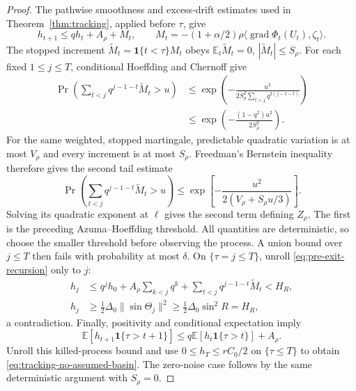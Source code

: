 \begin{proof}
The pathwise smoothness and excess-drift estimates used in
Theorem~\ref{thm:tracking}, applied before $\tau$, give
\begin{equation}
 h_{t+1}\le qh_t+A_\rho+M_t,\qquad
 M_t=-(1+\alpha/2)\rho
       \langle\operatorname{grad}\Phi_t(U_t),\zeta_t\rangle.
 \label{eq:pre-exit-recursion}
\end{equation}
The stopped increment $\widetilde M_t=\mathbf1\{t<\tau\}M_t$ obeys
$\mathbb E_t\widetilde M_t=0$, $|\widetilde M_t|\le S_\rho$.
For each fixed $1\le j\le T$, conditional Hoeffding and Chernoff give
\begin{align}
 \Pr\left(\sum_{t<j}q^{j-1-t}\widetilde M_t>u\right)
 &\le\exp\left(-\frac{u^2}{2S_\rho^2\sum_{t<j}q^{2(j-1-t)}}\right)\\
 &\le\exp\left(-\frac{(1-q^2)u^2}{2S_\rho^2}\right).
\end{align}
For the same weighted, stopped martingale, predictable quadratic
variation is at most $V_\rho$ and every increment is at most $S_\rho$.
Freedman's Bernstein inequality \cite{freedman1975tail,tropp2011freedman}
therefore gives the second tail estimate
\begin{equation}
 \Pr\left(\sum_{t<j}q^{j-1-t}\widetilde M_t>u\right)
 \le\exp\left[-\frac{u^2}{2(V_\rho+S_\rho u/3)}\right].
\end{equation}
Solving its quadratic exponent at $\ell$ gives the second term defining
$Z_\rho$. The first is the preceding Azuma--Hoeffding threshold. All
quantities are deterministic, so choose the smaller threshold before
observing the process. A union bound over $j\le T$ then fails with
probability at most $\delta$.
On $\{\tau=j\le T\}$, unroll \eqref{eq:pre-exit-recursion} only to $j$:
\begin{align}
 h_j&\le q^jh_0+A_\rho\sum_{k<j}q^k
                   +\sum_{t<j}q^{j-1-t}\widetilde M_t<H_R,\\
 h_j&\ge\tfrac12\Delta_0\|\sin\Theta_j\|^2
                   \ge\tfrac12\Delta_0\sin^2R=H_R,
\end{align}
a contradiction. Finally, positivity and conditional expectation imply
\begin{equation}
 \mathbb E[h_{t+1}\mathbf1\{\tau>t+1\}]
 \le q\mathbb E[h_t\mathbf1\{\tau>t\}]+A_\rho.
\end{equation}
Unroll this killed-process bound and use
$0\le h_T\le rC_0/2$ on $\{\tau\le T\}$ to obtain
\eqref{eq:tracking-no-assumed-basin}. The zero-noise case follows by the
same deterministic argument with $S_\rho=0$.
\end{proof}

